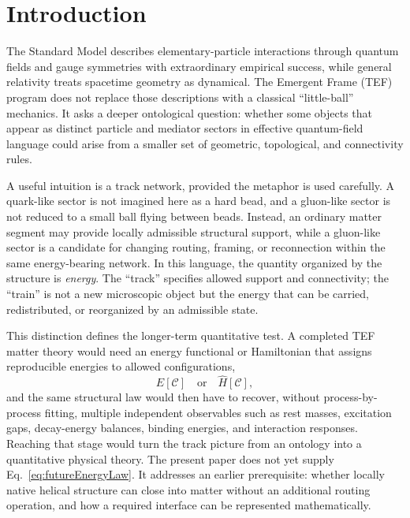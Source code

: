 \documentclass[10pt]{article}
\begin{document}
\section{Introduction}

The Standard Model describes elementary-particle interactions through quantum fields and gauge symmetries with extraordinary empirical success, while general relativity treats spacetime geometry as dynamical. The Emergent Frame (TEF) program does not replace those descriptions with a classical ``little-ball'' mechanics. It asks a deeper ontological question: whether some objects that appear as distinct particle and mediator sectors in effective quantum-field language could arise from a smaller set of geometric, topological, and connectivity rules.

A useful intuition is a track network, provided the metaphor is used carefully. A quark-like sector is not imagined here as a hard bead, and a gluon-like sector is not reduced to a small ball flying between beads. Instead, an ordinary matter segment may provide locally admissible structural support, while a gluon-like sector is a candidate for changing routing, framing, or reconnection within the same energy-bearing network. In this language, the quantity organized by the structure is \emph{energy}. The ``track'' specifies allowed support and connectivity; the ``train'' is not a new microscopic object but the energy that can be carried, redistributed, or reorganized by an admissible state.

This distinction defines the longer-term quantitative test. A completed TEF matter theory would need an energy functional or Hamiltonian that assigns reproducible energies to allowed configurations,
\begin{equation}
E[\mathcal C]
\quad\text{or}\quad
\hat H[\mathcal C],
\label{eq:futureEnergyLaw}
\end{equation}
and the same structural law would then have to recover, without process-by-process fitting, multiple independent observables such as rest masses, excitation gaps, decay-energy balances, binding energies, and interaction responses. Reaching that stage would turn the track picture from an ontology into a quantitative physical theory. The present paper does not yet supply Eq.~\eqref{eq:futureEnergyLaw}. It addresses an earlier prerequisite: whether locally native helical structure can close into matter without an additional routing operation, and how a required interface can be represented mathematically.
\end{document}
